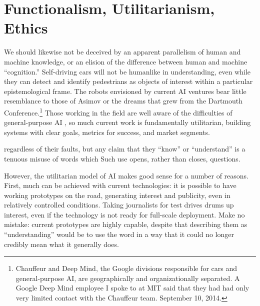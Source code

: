 \section{Functionalism, Utilitarianism, Ethics} 

We should likewise not be deceived by an apparent parallelism of human
and machine knowledge, or an elision of the difference between human
and machine ``cognition.'' Self-driving cars will not be humanlike in
understanding, even while they can detect and identify pedestrians as
objects of interest within a particular epistemological frame. The robots envisioned by current AI
ventures bear little resemblance to those of Asimov or the dreams that grew
from the Dartmouth Conference.\footnote{Chauffeur and Deep Mind, the
  Google divisions responsible for cars and general-purpose AI, are
geographically and organizationally separated. A Google Deep Mind
employee I spoke to at MIT said that they had had only very limited
contact with the Chauffeur team. September 10, 2014.}  Those working in the field are well aware of
the difficulties of general-purpose AI \cite{sofgeAIFears}, so much current work is
fundamentally utilitarian, building systems with clear goals, metrics
for success, and market segments.


regardless of their faults, but any claim that
they ``know'' or ``understand'' is a tenuous misuse of words which
Such use opens,
rather than closes, questions.

However, the utilitarian model of AI makes good sense for a number of reasons.
First, much can be achieved with current technologies:  it
is possible to have working prototypes on the road, generating
interest and publicity, even in relatively controlled conditions. Taking
journalists for test drives drums up interest, even if the technology
is not ready for full-scale deployment. Make no mistake: current
prototypes are highly capable, despite that describing them as
``understanding'' would be to use the word in a way that it
could no longer credibly mean what it generally does. 

